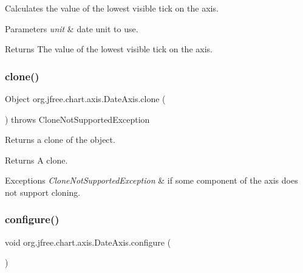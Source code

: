 Calculates the value of the lowest visible tick on the axis.


\begin{DoxyParams}{Parameters}
{\em unit} & date unit to use.\\
\hline
\end{DoxyParams}
\begin{DoxyReturn}{Returns}
The value of the lowest visible tick on the axis. 
\end{DoxyReturn}
\mbox{\label{classorg_1_1jfree_1_1chart_1_1axis_1_1_date_axis_a0767de66ff74d3b4de2973877c8e9721}} 
\subsubsection{\texorpdfstring{clone()}{clone()}}
{\footnotesize\ttfamily Object org.\+jfree.\+chart.\+axis.\+Date\+Axis.\+clone (\begin{DoxyParamCaption}{ }\end{DoxyParamCaption}) throws Clone\+Not\+Supported\+Exception}

Returns a clone of the object.

\begin{DoxyReturn}{Returns}
A clone.
\end{DoxyReturn}

\begin{DoxyExceptions}{Exceptions}
{\em Clone\+Not\+Supported\+Exception} & if some component of the axis does not support cloning. \\
\hline
\end{DoxyExceptions}
\mbox{\label{classorg_1_1jfree_1_1chart_1_1axis_1_1_date_axis_a9cdde2c745f785eb9965677351d6fba1}} 
\subsubsection{\texorpdfstring{configure()}{configure()}}
{\footnotesize\ttfamily void org.\+jfree.\+chart.\+axis.\+Date\+Axis.\+configure (\begin{DoxyParamCaption}{ }\end{DoxyParamCaption})}

